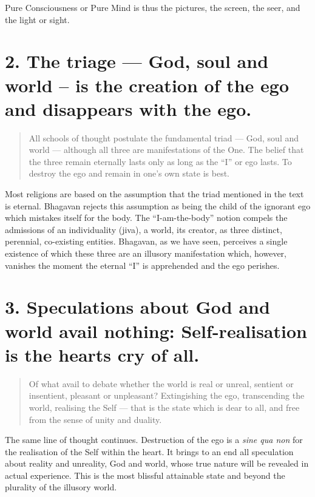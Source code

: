\documentclass[12pt]{report}
\begin{document}
Pure Consciousness or Pure Mind is thus the pictures, the screen, the
seer, and the light or sight.

\section{2. The triage --- God, soul and world -- is the creation of
  the ego and disappears with the ego.}

\begin{quote}
  All schools of thought postulate the fundamental triad --- God, soul
  and world --- although all three are manifestations of the One. The
  belief that the three remain eternally lasts only as long as the ``I''
  or ego lasts. To destroy the ego and remain in one's own state is best.
\end{quote}


Most religions are based on the assumption that the triad mentioned in
the text is eternal. Bhagavan rejects this assumption as being the
child of the ignorant ego which mistakes itself for the body. The
``I-am-the-body'' notion compels the admissions of an individuality
(jiva), a world, its creator, as three distinct, perennial,
co-existing entities. Bhagavan, as we have seen, perceives a single
existence of which these three are an illusory manifestation which,
however, vanishes the moment the eternal ``I'' is apprehended and the
ego perishes.

\section{3. Speculations about God and world avail nothing:
  Self-realisation is the hearts cry of all.}

\begin{quote}
  Of what avail to debate whether the world is real or unreal, sentient
  or insentient, pleasant or unpleasant? Extingishing the ego,
  transcending the world, realising the Self --- that is the state which
  is dear to all, and free from the sense of unity and duality.
\end{quote}


The same line of thought continues. Destruction of the ego is a
\emph{sine qua non} for the realisation of the Self within the
heart. It brings to an end all speculation about reality and
unreality, God and world, whose true nature will be revealed in actual
experience. This is the most blissful attainable state and beyond the
plurality of the illusory world.
\end{document}
